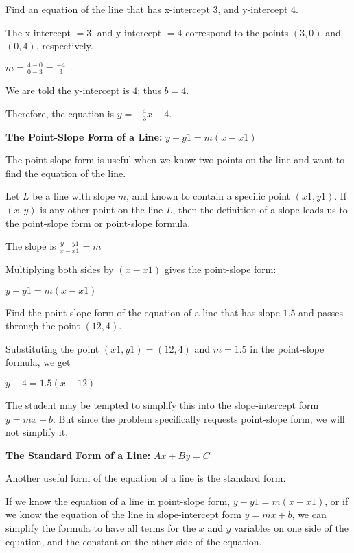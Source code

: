 \begin{example}
Find an equation of the line that has x-intercept $3$, and y-intercept $4$.
\end{example}

\begin{solution}
The x-intercept $= 3$, and y-intercept $= 4$ correspond to the points $(3, 0)$ and $(0, 4)$, respectively.

$m = \frac{4 - 0}{0 - 3} = \frac{-4}{3}$

We are told the y-intercept is $4$; thus $b = 4$.

Therefore, the equation is $y = -\frac{4}{3}x + 4$.
\end{solution}

\textbf{The Point-Slope Form of a Line:} $y - y1 = m(x - x1)$

The point-slope form is useful when we know two points on the line and want to find the equation of the line.

Let $L$ be a line with slope $m$, and known to contain a specific point $(x1, y1)$. If $(x, y)$ is any other point on the line $L$, then the definition of a slope leads us to the point-slope form or point-slope formula.

The slope is $\frac{y - y1}{x - x1} = m$

Multiplying both sides by $(x - x1)$ gives the point-slope form:

$y - y1 = m(x - x1)$

\begin{example}
Find the point-slope form of the equation of a line that has slope $1.5$ and passes through the point $(12,4)$.
\end{example}

\begin{solution}
Substituting the point $(x1, y1) = (12,4)$ and $m= 1.5$ in the point-slope formula, we get

$y - 4 = 1.5(x - 12)$

The student may be tempted to simplify this into the slope-intercept form $y = mx + b$. But since the problem specifically requests point-slope form, we will not simplify it.
\end{solution}

\textbf{The Standard Form of a Line:} $Ax + By = C$

Another useful form of the equation of a line is the standard form.

If we know the equation of a line in point-slope form, $y - y1 = m(x - x1)$, or if we know the equation of the line in slope-intercept form $y = mx + b$, we can simplify the formula to have all terms for the $x$ and $y$ variables on one side of the equation, and the constant on the other side of the equation.

